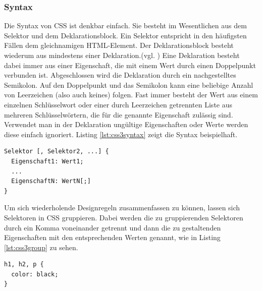 \subsubsection{Syntax} Die Syntax von CSS ist denkbar einfach. Sie besteht im Wesentlichen aus dem Selektor und dem Deklarationsblock. Ein Selektor entspricht in den häufigsten Fällen dem gleichnamigen HTML-Element. Der Deklarationsblock besteht wiederum aus mindestens einer Deklaration.(vgl. \cite[S.26]{MeyeCasc2005}) \glqq Eine Deklaration besteht dabei immer aus einer Eigenschaft, die mit einem Wert durch einen Doppelpunkt verbunden ist. Abgeschlossen wird die Deklaration durch ein nachgestelltes Semikolon. Auf den Doppelpunkt und das Semikolon kann eine beliebige Anzahl von Leerzeichen (also auch keines) folgen. Fast immer besteht der Wert aus einem einzelnen Schlüsselwort oder einer durch Leerzeichen getrennten Liste aus mehreren Schlüsselwörtern, die für die genannte Eigenschaft zulässig sind.\grqq{}\cite[S.28]{MeyeCasc2005} Verwendet man in der Deklaration ungültige Eigenschaften oder Werte werden diese einfach ignoriert. Listing \ref{lst:css3syntax} zeigt die Syntax beispielhaft.

\vspace{1em}
\begin{lstlisting}[language=HTML5, caption=CSS3 Syntax Beispiel, label=lst:css3syntax]
Selektor [, Selektor2, ...] {
  Eigenschaft1: Wert1;
  ...
  EigenschaftN: WertN[;]
}
\end{lstlisting}

Um sich wiederholende Designregeln zusammenfassen zu können, lassen sich Selektoren in CSS gruppieren. Dabei werden die zu gruppierenden Selektoren durch ein Komma voneinander getrennt und dann die zu gestaltenden Eigenschaften mit den entsprechenden Werten genannt, wie in Listing \ref{lst:css3group} zu sehen.

\vspace{1em}
\begin{lstlisting}[language=HTML5, caption=CSS3 Gruppierung, label=lst:css3group]
h1, h2, p {
  color: black;
}
\end{lstlisting}

